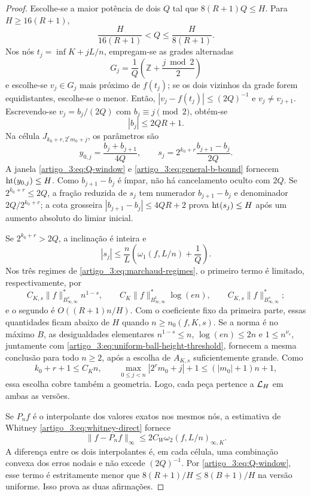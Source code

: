 \begin{proof}
Escolhe-se a maior potência de dois $Q$ tal que
$8(R+1)Q\le H$. Para $H\ge16(R+1)$,
\begin{equation}
 \frac{H}{16(R+1)}<Q\le\frac{H}{8(R+1)}.
 \label{artigo_3:eq:Q-window}
\end{equation}
Nos nós $t_j=\inf K+jL/n$, empregam-se as grades alternadas
\[
 G_j=\frac1Q\left(\mathbb Z+\frac{j\bmod2}{2}\right)
\]
e escolhe-se $v_j\in G_j$ mais próximo de $f(t_j)$; se os dois vizinhos da grade
forem equidistantes, escolhe-se o menor. Então,
$|v_j-f(t_j)|\le(2Q)^{-1}$ e $v_j\ne v_{j+1}$. Escrevendo-se
$v_j=b_j/(2Q)$ com $b_j\equiv j\pmod2$, obtém-se
\begin{equation}
 |b_j|\le2QR+1.
 \label{artigo_3:eq:general-b-bound}
\end{equation}
Na célula $J_{k_0+r,2^rm_0+j}$, os parâmetros são
\begin{equation}
 y_{0,j}=\frac{b_j+b_{j+1}}{4Q},
 \qquad
 s_j=2^{k_0+r}\frac{b_{j+1}-b_j}{2Q}.
 \label{artigo_3:eq:general-atom-parameters}
\end{equation}
A janela \eqref{artigo_3:eq:Q-window} e \eqref{artigo_3:eq:general-b-bound} fornecem
$\operatorname{ht}(y_{0,j})\le H$. Como $b_{j+1}-b_j$ é ímpar, não há cancelamento
oculto com $2Q$. Se $2^{k_0+r}\le2Q$, a fração reduzida de $s_j$ tem
numerador $b_{j+1}-b_j$ e denominador $2Q/2^{k_0+r}$; a cota grosseira
$|b_{j+1}-b_j|\le4QR+2$ prova $\operatorname{ht}(s_j)\le H$ após um aumento absoluto
do limiar inicial.

Se $2^{k_0+r}>2Q$, a inclinação é inteira e
\begin{equation}
 |s_j|
 \le \frac nL\left(\omega_1(f,L/n)+\frac1Q\right).
 \label{artigo_3:eq:slope-marchaud-bound}
\end{equation}
Nos três regimes de \eqref{artigo_3:eq:marchaud-regimes}, o primeiro termo é limitado,
respectivamente, por
\[
 C_{K,s}\|f\|_{B^s_{\infty,\infty}}^*n^{1-s},\qquad
 C_{K}\|f\|_{B^1_{\infty,\infty}}^*\log(en),\qquad
 C_{K,s}\|f\|_{B^s_{\infty,\infty}}^*;
\]
e o segundo é $O((R+1)n/H)$. Com o coeficiente fixo da primeira parte, essas
quantidades ficam abaixo de $H$ quando $n\ge n_0(f,K,s)$. Se a norma é no
máximo $B$, as desigualdades elementares
$n^{1-s}\le n$, $\log(en)\le2n$ e $1\le n^{\nu_s}$, juntamente com
\eqref{artigo_3:eq:uniform-ball-height-threshold}, fornecem a mesma conclusão para todo
$n\ge2$, após a escolha de $A_{K,s}$ suficientemente grande. Como
\[
 k_0+r+1\le C_Kn,\qquad
 \max_{0\le j<n}|2^rm_0+j|+1\le(|m_0|+1)n+1,
\]
essa escolha cobre também a geometria. Logo, cada peça pertence a
$\mathcal{L}_H$ em ambas as versões.

Se $P_nf$ é o interpolante dos valores exatos nos mesmos nós, a estimativa
de Whitney \eqref{artigo_3:eq:whitney-direct} fornece
\[
 \|f-P_nf\|_\infty
 \le2C_W\omega_2(f,L/n)_{\infty,K}.
\]
A diferença entre os dois interpolantes é, em cada célula, uma combinação
convexa dos erros nodais e não excede $(2Q)^{-1}$. Por \eqref{artigo_3:eq:Q-window},
esse termo é estritamente menor que
$8(R+1)/H\le8(B+1)/H$ na versão uniforme. Isso prova as duas afirmações.
\end{proof}

